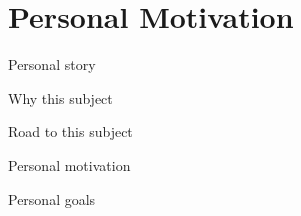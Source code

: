 \chapter{Personal Motivation}

Personal story

Why this subject

Road to this subject

Personal motivation

Personal goals
